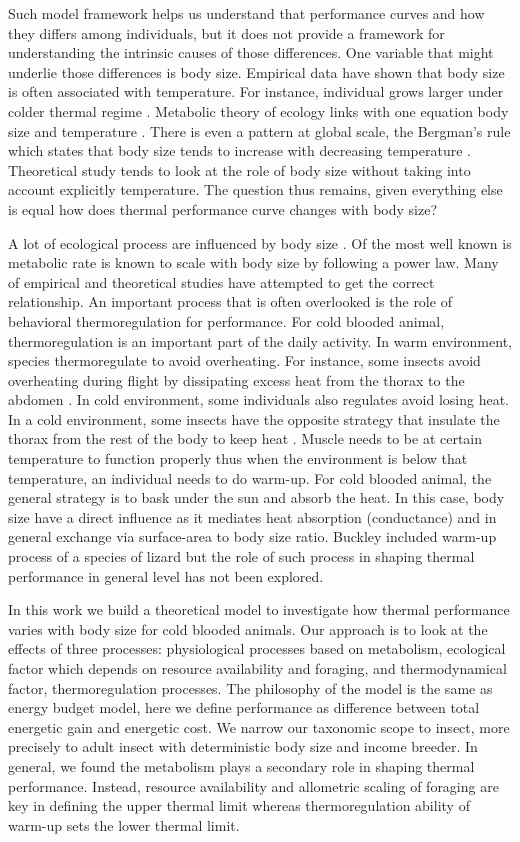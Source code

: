 Such model framework helps us understand that performance curves and how they differs  among individuals, but it does not provide a framework for understanding the intrinsic causes of those differences.
One variable that might underlie those differences is body size.
Empirical data have shown that body size is often associated with temperature.  
For instance, individual grows larger under colder thermal regime \citep{Van1996}.
Metabolic theory of ecology links with one equation body size and temperature \citep{Brown2004}.
There is even a pattern at global scale, the Bergman's rule which states that body size tends to increase with decreasing temperature \citep{Bergman1847}. 
Theoretical study tends to look at the role of body size without taking into account explicitly temperature.
The question thus remains, given everything else is equal how does thermal performance curve changes with body size?

A lot of ecological process are influenced by body size \citep{Peters1986}.
Of the most well known is metabolic rate is known to scale with body size by following a power law.
Many of empirical and theoretical studies have attempted to get the correct relationship.
An important process that is often overlooked is the role of behavioral thermoregulation for performance. 
For cold blooded animal, thermoregulation is an important part of the daily activity.
In warm environment, species thermoregulate to avoid overheating.
For instance, some insects avoid overheating during flight by dissipating excess heat from the thorax to the abdomen \citep{Verdu2012}.
In cold environment, some individuals also regulates avoid losing heat.
In a cold environment, some insects have the opposite strategy that insulate the thorax from the rest of the body to keep heat \citep{Verdu2012}.
Muscle needs to be at certain temperature to function properly thus when the environment is below that temperature, an individual needs to do warm-up. 
For cold blooded animal, the general strategy is to bask under the sun and absorb the heat.
In this case, body size have a direct influence as it mediates heat absorption (conductance) and in general exchange via surface-area to body size ratio.
Buckley included warm-up process of a species of lizard but the role of such process in shaping thermal performance in general level has not been explored. 

In this work we build a theoretical model to investigate how thermal performance varies with body size for cold blooded animals. 
Our approach is to look at the effects of three processes: physiological processes based on metabolism, ecological factor which depends on resource availability and foraging, and thermodynamical factor, thermoregulation processes.
The philosophy of the model is the same as energy budget model, here we define performance as difference between total energetic gain and energetic cost.
We narrow our taxonomic scope to insect, more precisely to adult insect with deterministic body size and income breeder. 
In general, we found the metabolism plays a secondary role in shaping thermal performance.
Instead, resource availability and allometric scaling of foraging are key in defining the upper thermal limit whereas thermoregulation ability of warm-up sets the lower thermal limit.
